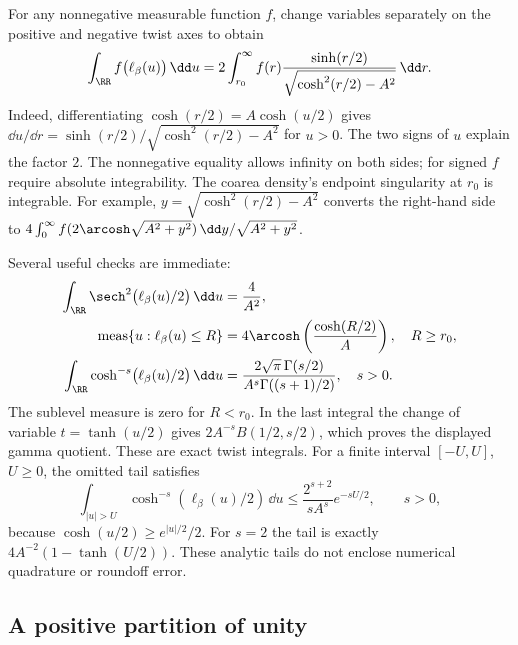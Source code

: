 For any nonnegative measurable function $f$, change variables separately
on the positive and negative twist axes to obtain
\begin{equation}
 \int_{\RR}f\bigl(\ell_\beta(u)\bigr)\,\dd u
 =2\int_{r_0}^\infty
 f(r)\frac{\sinh(r/2)}{\sqrt{\cosh^2(r/2)-A^2}}\,\dd r.
 \label{eq:toruscoarea}
\end{equation}
Indeed, differentiating $\cosh(r/2)=A\cosh(u/2)$ gives
$\dd u/\dd r=\sinh(r/2)/\sqrt{\cosh^2(r/2)-A^2}$ for $u>0$.
The two signs of $u$ explain the factor $2$. The nonnegative equality
allows infinity on both sides; for signed $f$ require absolute
integrability. The coarea density's endpoint singularity at $r_0$ is
integrable. For
example, $y=\sqrt{\cosh^2(r/2)-A^2}$ converts the right-hand side to
$4\int_0^\infty f(2\arcosh\sqrt{A^2+y^2})\,\dd y/\sqrt{A^2+y^2}$.

Several useful checks are immediate:
\begin{align}
 \int_{\RR}\sech^2\bigl(\ell_\beta(u)/2\bigr)\,\dd u
     &=\frac4{A^2},\label{eq:sechintegral}\\
 \operatorname{meas}\{u:\ell_\beta(u)\le R\}
     &=4\arcosh\left(\frac{\cosh(R/2)}{A}\right),\quad R\ge r_0,
       \label{eq:sublevel}\\
 \int_{\RR}\cosh^{-s}\bigl(\ell_\beta(u)/2\bigr)\,\dd u
     &=\frac{2\sqrt\pi\,\Gamma(s/2)}
             {A^s\Gamma((s+1)/2)},\quad s>0.
       \label{eq:betaintegral}
\end{align}
The sublevel measure is zero for $R<r_0$. In the last integral the change
of variable $t=\tanh(u/2)$ gives
$2A^{-s}B(1/2,s/2)$, which proves the displayed gamma quotient.
These are exact twist integrals. For a finite interval $[-U,U]$, $U\geq0$,
the omitted tail satisfies
\begin{equation}
 \int_{|u|>U}\cosh^{-s}(\ell_\beta(u)/2)\,\dd u
 \leq\frac{2^{s+2}}{sA^s}e^{-sU/2},\qquad s>0,
 \label{eq:torusintegraltail}
\end{equation}
because $\cosh(u/2)\geq e^{|u|/2}/2$.
For $s=2$ the tail is exactly $4A^{-2}(1-\tanh(U/2))$.
These analytic tails do not enclose numerical quadrature or roundoff error.

\subsection{A positive partition of unity}

